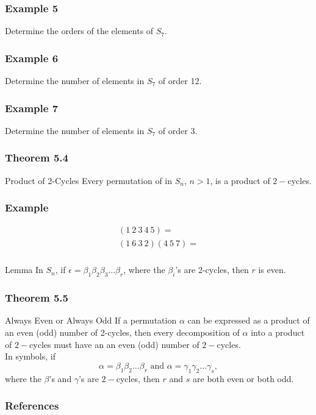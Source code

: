 \documentclass{beamer}
\begin{document}
\begin{frame}
    \frametitle{Example 5}

    Determine the orders of the elements of \(S_7\). 

\end{frame}

\begin{frame}
    \frametitle{Example 6}

    Determine the number of elements in \(S_7\) of order 12. 

\end{frame}

\begin{frame}
    \frametitle{Example 7}

    Determine the number of elements in \(S_7\) of order \(3\). 

\end{frame}

\begin{frame}
    \frametitle{Theorem 5.4}
    \begin{block}{Product of 2-Cycles}
          Every permutation of in \(S_n\), \(n>1\), is a product of \(2-\)cycles.   
    \end{block}

    

\end{frame}

\begin{frame}
    \frametitle{Example }

    \begin{align*}
        (1~2~3~4~5)=\\
        (1~6~3~2)(4~5~7)=
    \end{align*}

\end{frame}

\begin{frame}
    \frametitle{}
\begin{block}{Lemma}
    In \(S_n\), if \(\epsilon = \beta_1\beta_2 \beta_3 \dots \beta_r\), where the \(\beta_i\)'s are 2-cycles, then \(r\) is even. 
\end{block}
    

\end{frame}

\begin{frame}
    \frametitle{Theorem 5.5}

    \begin{block}{Always Even or Always Odd}
        If a permutation \(\alpha\) can be expressed as a product of an even (odd) number of 2-cycles, then every decomposition of \(\alpha\) into a product of \(2-\)cycles must have an an even (odd) number of \(2-\)cycles. \\
        \vspace{0.2in}
        In symbols, if \[\alpha = \beta_1 \beta_2 \dots \beta_r \text{ and } \alpha = \gamma_1 \gamma_2 \dots \gamma_s,\] where the \(\beta\)'s and \(\gamma\)'s are \(2-\)cycles, then \(r\) and \(s\) are both even or both odd.
    \end{block}

\end{frame}

\begin{frame}
    \frametitle{References}
\end{frame}
\end{document}
